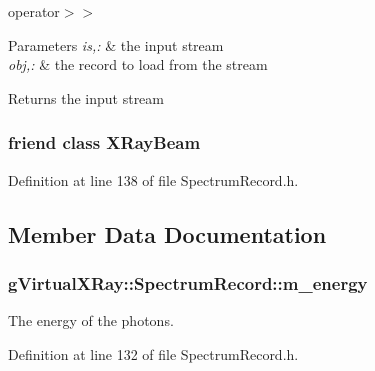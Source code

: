 operator$>$$>$ 


\begin{DoxyParams}{Parameters}
{\em is,:} & the input stream \\
\hline
{\em obj,:} & the record to load from the stream \\
\hline
\end{DoxyParams}
\begin{DoxyReturn}{Returns}
the input stream 
\end{DoxyReturn}
\hypertarget{classg_virtual_x_ray_1_1_spectrum_record_a557b59f8b44e4ba7ffeb47f5b996f88e}{
\subsubsection[{XRayBeam}]{\setlength{\rightskip}{0pt plus 5cm}friend class {\bf XRayBeam}}}
\label{classg_virtual_x_ray_1_1_spectrum_record_a557b59f8b44e4ba7ffeb47f5b996f88e}


Definition at line 138 of file SpectrumRecord.h.



\subsection{Member Data Documentation}
\hypertarget{classg_virtual_x_ray_1_1_spectrum_record_a4591e49e25dce0c8a2c03969c2a7e685}{
\subsubsection[{m\_\-energy}]{ {\bf gVirtualXRay::SpectrumRecord::m\_\-energy}}}
\label{classg_virtual_x_ray_1_1_spectrum_record_a4591e49e25dce0c8a2c03969c2a7e685}


The energy of the photons. 



Definition at line 132 of file SpectrumRecord.h.

